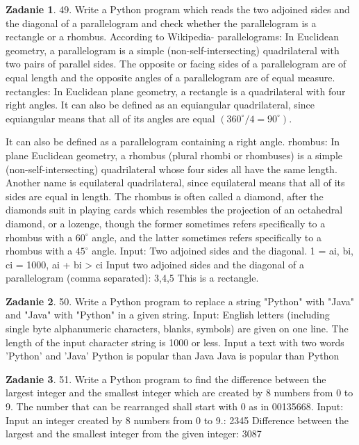 \documentclass[11pt]{article}
\theoremstyle{definition}
\newtheorem{zadanie}{Zadanie}
\begin{document}
\begin{zadanie}


49. Write a Python program which reads the two adjoined sides and the diagonal of a parallelogram and check whether the parallelogram is a rectangle or a rhombus. 
According to Wikipedia-
parallelograms: In Euclidean geometry, a parallelogram is a simple (non-self-intersecting) quadrilateral with two pairs of parallel sides. The opposite or facing sides of a parallelogram are of equal length and the opposite angles of a parallelogram are of equal measure.
rectangles: In Euclidean plane geometry, a rectangle is a quadrilateral with four right angles. It can also be defined as an equiangular quadrilateral, since equiangular means that all of its angles are equal 
$(360^\circ/4 = 90^\circ)$.

 It can also be defined as a parallelogram containing a right angle.
rhombus: In plane Euclidean geometry, a rhombus (plural rhombi or rhombuses) is a simple (non-self-intersecting) quadrilateral whose four sides all have the same length. Another name is equilateral quadrilateral, since equilateral means that all of its sides are equal in length. The rhombus is often called a diamond, after the diamonds suit in playing cards which resembles the projection of an octahedral diamond, or a lozenge, though the former sometimes refers specifically to a rhombus with a $60^\circ$ angle, and the latter sometimes refers specifically to a rhombus with a $45^\circ$ angle.
Input:
Two adjoined sides and the diagonal.
1 = ai, bi, ci = 1000, ai + bi > ci
Input two adjoined sides and the diagonal of a parallelogram (comma separated):
3,4,5
This is a rectangle.

\end{zadanie}

\begin{zadanie}


50. Write a Python program to replace a string "Python" with "Java" and "Java" with "Python" in a given string. 
Input:
English letters (including single byte alphanumeric characters, blanks, symbols) are given on one line. The length of the input character string is 1000 or less.
Input a text with two words 'Python' and 'Java'
Python is popular than Java
Java is popular than Python

\end{zadanie}

\begin{zadanie}


51. Write a Python program to find the difference between the largest integer and the smallest integer which are created by 8 numbers from 0 to 9. The number that can be rearranged shall start with 0 as in 00135668. 
Input:
Input an integer created by 8 numbers from 0 to 9.:
2345
Difference between the largest and the smallest integer from the given integer:
3087

\end{zadanie}
\end{document}
